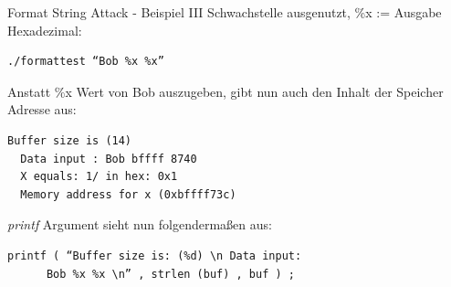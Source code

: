 \documentclass[10pt]{beamer}
\begin{document}
\begin{frame}[fragile]{Format String Attack - Beispiel III}
  Schwachstelle ausgenutzt, \%x := Ausgabe Hexadezimal:
  \begin{lstlisting}[style=BashStyle]
  ./formattest “Bob %x %x”
  \end{lstlisting}

  Anstatt \%x Wert von Bob auszugeben, gibt nun auch den Inhalt der Speicher Adresse aus:
  \begin{lstlisting}[style=BashStyle]
  Buffer size is (14)
  Data input : Bob bffff 8740
  X equals: 1/ in hex: 0x1
  Memory address for x (0xbffff73c)
  \end{lstlisting}

  \textit{printf} Argument sieht nun folgenderma{\ss}en aus:
  \begin{lstlisting}[style=CStyle]
  printf ( “Buffer size is: (%d) \n Data input:
      Bob %x %x \n” , strlen (buf) , buf ) ;
  \end{lstlisting}
\end{frame}








\end{document}
